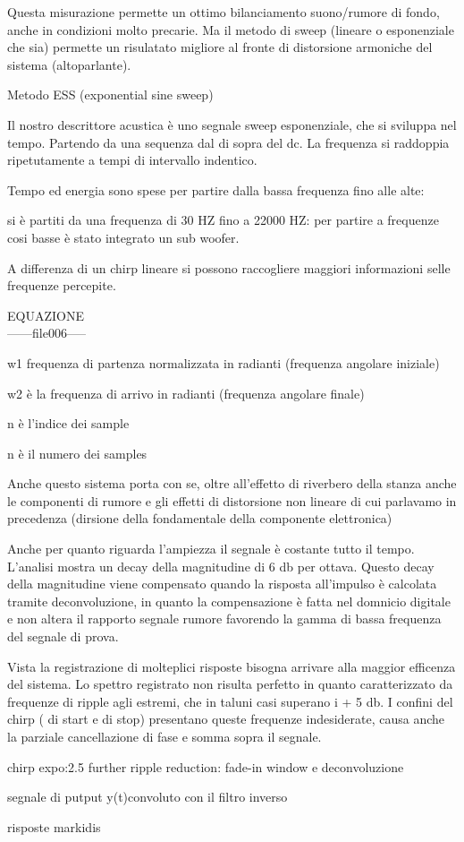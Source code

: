 Questa misurazione permette un ottimo bilanciamento suono/rumore di fondo,
anche in condizioni molto precarie.
Ma il metodo  di sweep (lineare o esponenziale che sia) permette un risulatato
migliore al fronte di distorsione armoniche del sistema (altoparlante).

Metodo ESS (exponential sine sweep)

Il nostro descrittore acustica è uno segnale sweep esponenziale, che si sviluppa nel tempo.
Partendo da una sequenza dal di sopra del dc. 
La frequenza si raddoppia ripetutamente a tempi di intervallo indentico.

Tempo ed energia sono spese per partire dalla bassa frequenza fino alle alte:

si è partiti da una frequenza di 30 HZ fino a 22000 HZ:
per partire a frequenze cosi basse è stato integrato un sub woofer.

A differenza di un chirp lineare si possono raccogliere maggiori informazioni selle frequenze percepite. 

EQUAZIONE \\
------file006-----

w1 frequenza di partenza normalizzata in radianti (frequenza angolare iniziale)

w2 è la frequenza di arrivo in radianti (frequenza angolare finale)

n è l'indice dei sample

n è il numero dei samples

Anche questo sistema porta con se, oltre all'effetto di riverbero della stanza anche
le componenti di rumore e gli effetti di distorsione non lineare di cui parlavamo in
precedenza (dirsione della fondamentale della componente elettronica)

Anche per quanto riguarda l'ampiezza il segnale è costante tutto il tempo. L'analisi
mostra un decay della magnitudine di 6 db per ottava. Questo decay della magnitudine
viene compensato quando la risposta all'impulso è calcolata tramite deconvoluzione,
in quanto la compensazione è fatta nel domnicio digitale e non altera il rapporto
segnale rumore favorendo la gamma di bassa frequenza del segnale di prova.

Vista la registrazione di molteplici risposte bisogna arrivare alla maggior efficenza
del sistema.
 Lo spettro registrato non risulta perfetto in quanto caratterizzato da frequenze di
 ripple agli estremi, che in taluni casi superano i + 5 db. I confini del chirp ( di start e di stop)
 presentano queste frequenze indesiderate, causa anche la parziale cancellazione di fase e somma sopra il segnale. 


chirp expo:2.5 further ripple reduction: fade-in window  e deconvoluzione

segnale di putput y(t)convoluto con il filtro inverso

risposte markidis


